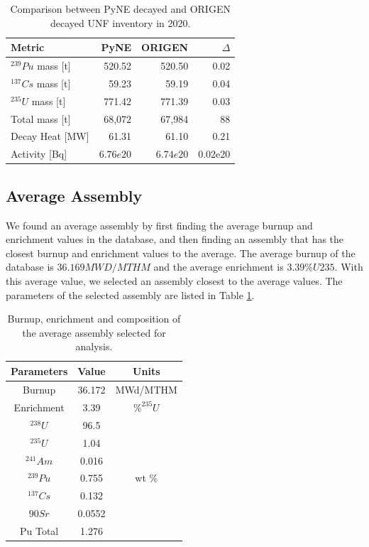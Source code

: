 \documentclass{anstrans}
\begin{document}
\begin{table}[h]
    \centering
    \begin{tabular}{lrrr}
        \hline
        Metric & PyNE & ORIGEN & $\Delta$ \\
        \hline
        $^{239}Pu$ mass [t] & 520.52 & 520.50 & 0.02\\
        $^{137}Cs$ mass [t] & 59.23 & 59.19 & 0.04\\
        $^{235}U$ mass [t] & 771.42 & 771.39 & 0.03\\
        Total mass [t] & 68,072 & 67,984 & 88\\
        Decay Heat [MW] & 61.31 & 61.10 & 0.21 \\
        Activity [Bq] & $6.76e20$ & $6.74e20$ & 0.02e20 \\
        \hline
    \end{tabular}
    \caption{Comparison between \gls{PyNE} decayed and ORIGEN decayed \gls{UNF} inventory in 2020.}
\end{table}

\subsection{Average Assembly}
We found an average assembly by first finding the
average burnup and enrichment values in the database,
and then finding an assembly that has the closest
burnup and enrichment values to the average.
The average burnup of the database is $36.169 MWD/MTHM$
and the average enrichment is $3.39 \% U235$. With this
average value, we selected an assembly closest to the
average values. The parameters of the selected assembly
are listed in Table \ref{tab:avg}.

\begin{table}[h]
    \centering
    \begin{tabular}{ccc}
        \hline
        Parameters & Value & Units  \\
        \hline
        Burnup & 36.172 & MWd/MTHM \\
        Enrichment & 3.39 & $\% ^{235}U$ \\
        \hline
        $^{238}U$ & 96.5 & \multirow{7}{*}{wt \%} \\
        $^{235}U$ & 1.04 & \\
        $^{241}Am$ & 0.016 & \\
        $^{239}Pu$ & 0.755 &  \\
        $^{137}Cs$ & 0.132 &  \\
        ${90}Sr$ & 0.0552 &  \\
        Pu Total & 1.276 &  \\
        \hline
    \end{tabular}
    \caption{Burnup, enrichment and composition of the average
             assembly selected for analysis.}
    \label{tab:avg}
\end{table}
\end{document}
